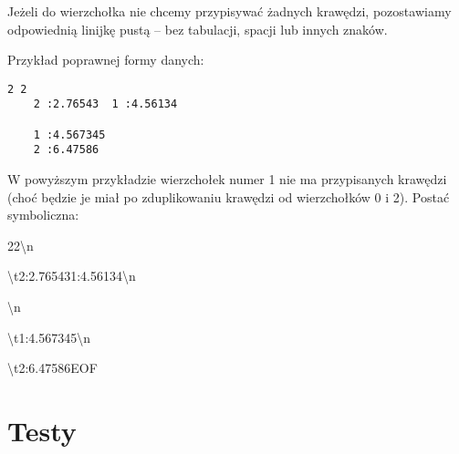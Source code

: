 \documentclass[]{article}
\begin{document}
Jeżeli do wierzchołka nie chcemy przypisywać żadnych krawędzi, pozostawiamy odpowiednią linijkę pustą – bez tabulacji, spacji lub innych znaków.

Przykład poprawnej formy danych:
\begin{verbatim}
2 2
    2 :2.76543  1 :4.56134

    1 :4.567345
    2 :6.47586
\end{verbatim}
W powyższym przykładzie wierzchołek numer 1 nie ma przypisanych krawędzi (choć będzie je miał po zduplikowaniu krawędzi od wierzchołków 0 i 2).
Postać symboliczna:

2\texttt{\verbvisiblespace}2\textbackslash n

\textbackslash t2\texttt{\verbvisiblespace}:2.76543\texttt{\verbvisiblespace}\texttt{\verbvisiblespace}1\texttt{\verbvisiblespace}:4.56134\textbackslash n

\textbackslash n

\textbackslash t1\texttt{\verbvisiblespace}:4.567345\textbackslash n

\textbackslash t2\texttt{\verbvisiblespace}:6.47586EOF

\section{Testy}\label{header-n233}
\end{document}
